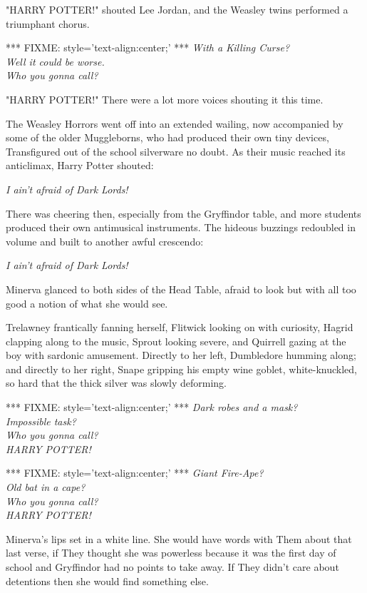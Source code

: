 "HARRY POTTER!" shouted Lee Jordan, and the Weasley twins performed a triumphant chorus.

*** FIXME: style='text-align:center;' ***
\emph{With a Killing Curse?\\
Well it could be worse.\\
Who you gonna call?}

"HARRY POTTER!" There were a lot more voices shouting it this time.

The Weasley Horrors went off into an extended wailing, now accompanied by some of the older Muggleborns, who had produced their own tiny devices, Transfigured out of the school silverware no doubt. As their music reached its anticlimax, Harry Potter shouted:

\emph{I ain't afraid of Dark Lords!}

There was cheering then, especially from the Gryffindor table, and more students produced their own antimusical instruments. The hideous buzzings redoubled in volume and built to another awful crescendo:

\emph{I ain't afraid of Dark Lords!}

Minerva glanced to both sides of the Head Table, afraid to look but with all too good a notion of what she would see.

Trelawney frantically fanning herself, Flitwick looking on with curiosity, Hagrid clapping along to the music, Sprout looking severe, and Quirrell gazing at the boy with sardonic amusement. Directly to her left, Dumbledore humming along; and directly to her right, Snape gripping his empty wine goblet, white-knuckled, so hard that the thick silver was slowly deforming.

*** FIXME: style='text-align:center;' ***
\emph{Dark robes and a mask?\\
Impossible task?\\
Who you gonna call?\\
HARRY POTTER!}

*** FIXME: style='text-align:center;' ***
\emph{Giant Fire-Ape?\\
Old bat in a cape?\\
Who you gonna call?\\
HARRY POTTER!}

Minerva's lips set in a white line. She would have words with Them about that last verse, if They thought she was powerless because it was the first day of school and Gryffindor had no points to take away. If They didn't care about detentions then she would find something else.

